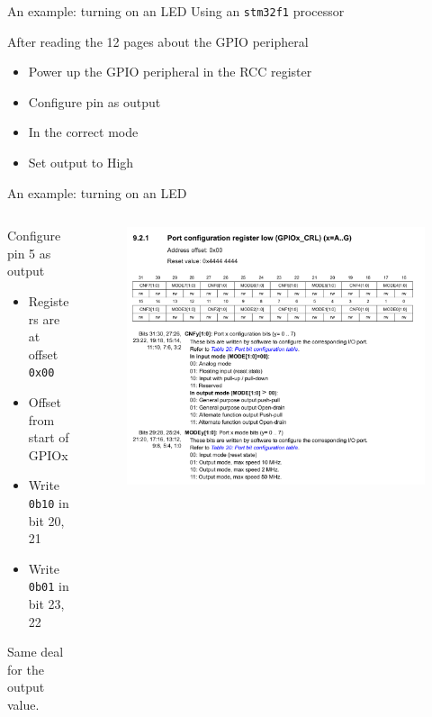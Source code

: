 \documentclass[169]{beamer}
\begin{document}
\begin{frame}{An example: turning on an LED}
    Using an \texttt{stm32f1} processor

    After reading the 12 pages about the GPIO peripheral
    \begin{itemize}
        \item{Power up the GPIO peripheral in the RCC register}
        \item{Configure pin as output}
        \item{In the correct mode}
        \item{Set output to High}
    \end{itemize}
\end{frame}

\begin{frame}{An example: turning on an LED}
    \begin{columns}
        \begin{column}{0.5\textwidth}
            Configure pin 5 as output

            \begin{itemize}
                \item{Registers are at offset \texttt{0x00}}
                \item{Offset from start of GPIOx}
                \item{Write \texttt{0b10} in bit 20, 21}
                \item{Write \texttt{0b01} in bit 23, 22}
            \end{itemize}

            Same deal for the output value.
        \end{column}
        \begin{column}{0.5\textwidth}
            \begin{figure}
                \includegraphics[width=\textwidth]{fig/gpio_crl.png}
            \end{figure}
        \end{column}
    \end{columns}
\end{frame}
\end{document}
